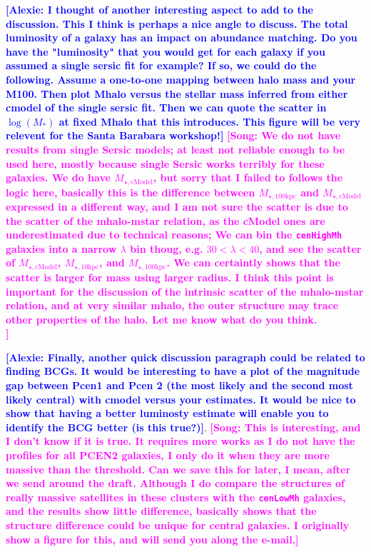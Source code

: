 \documentclass{emulateapj}
\def\rbcg{\texttt{cenHighMh}}
\def\nbcg{\texttt{cenLowMh}}
\def\minn{{$M_{\star,10\mathrm{kpc}}$}}
\def\mtot{{$M_{\star,100\mathrm{kpc}}$}}
\def\mcmodel{{$M_{\star,\mathrm{cModel}}$}}
\newcommand{\song}[1]{\textcolor{magenta}{\textbf{[Song: #1]}}}
\newcommand{\alexie}[1]{\textcolor{blue}{\textbf{[Alexie: #1]}}}
\begin{document}
\begin{CJK*}{UTF8}{gbsn}
    \alexie{I thought of another interesting aspect to add to the discussion. This I think is perhaps a nice angle to discuss. The total luminosity of a galaxy has an impact on abundance matching. Do you have the "luminosity" that you would get for each galaxy if you assumed a single sersic fit for example? If so, we could do the following. Assume a one-to-one mapping between halo mass and your M100. Then plot Mhalo versus the stellar mass inferred from either cmodel of the single sersic fit. Then we can quote the scatter in $\log(M_*)$ at fixed Mhalo that this introduces. This figure will be very relevent for the Santa Barabara workshop!}
    \song{We do not have results from single Sersic models; at least not reliable enough 
    to be used here, mostly because single Sersic works terribly for these galaxies.
    We do have \mcmodel{}, but sorry that I failed to follows the logic here, basically this is 
    the difference between \mtot{} and \mcmodel{} expressed in a different way, and I am not 
    sure the scatter is due to the scatter of the mhalo-mstar relation, as the cModel 
    ones are underestimated due to technical reasons; We can bin the \rbcg{} galaxies 
    into a narrow $\lambda$ bin thoug, e.g. $30< \lambda < 40$, and see the scatter of 
    \mcmodel{}, \minn{}, and \mtot{}. We can certaintly shows that the scatter is larger 
    for mass using larger radius.  I think this point is important for the discussion
    of the intrinsic scatter of the mhalo-mstar relation, and at very similar mhalo,
    the outer structure may trace other properties of the halo. Let me know what do 
    you think.\\}
    
    \alexie{Finally, another quick discussion paragraph could be related to finding BCGs. It would be interesting to have a plot of the magnitude gap between Pcen1 and Pcen 2 (the most likely and the second most likely central) with cmodel versus your estimates. It would be nice to show that having a better luminosty estimate will enable you to identify the BCG better (is this true?)}.
    \song{This is interesting, and I don't know if it is true. It requires more works as 
    I do not have the profiles for all PCEN2 galaxies, I only do it when they are more 
    massive than the threshold.  Can we save this for later, I mean, after we send around 
    the draft.  Although I do compare the structures of really massive satellites in 
    these clusters with the \nbcg{} galaxies, and the results show little difference,
    basically shows that the structure difference could be unique for central galaxies. 
    I originally show a figure for this, and will send you along the e-mail.}
    

\end{CJK*}
\end{document}
